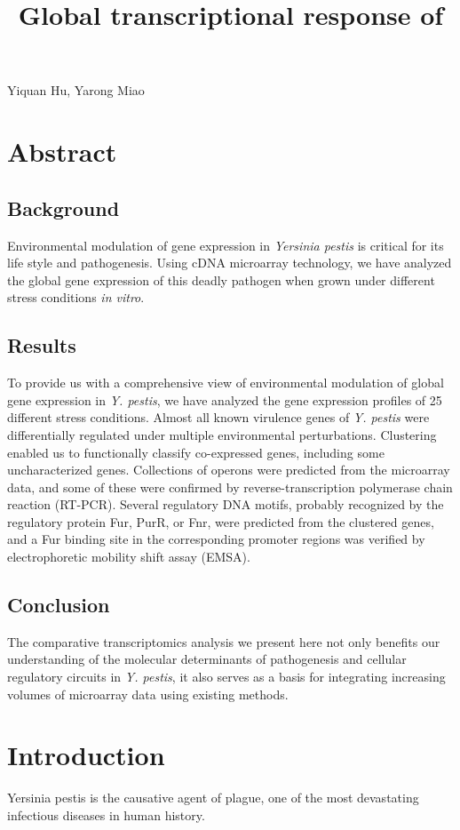 \documentclass[11pt,a4paper]{article}
\title{Global transcriptional response of}
\begin{document}
\maketitle

Yiquan Hu, Yarong Miao

\section{Abstract}

\subsection{Background}

Environmental modulation of gene expression in \textit{Yersinia pestis} is critical for its life style and pathogenesis. Using cDNA microarray technology, we have analyzed the global gene expression of this deadly pathogen when grown under different stress conditions \textit{in vitro}.

\subsection{Results}

To provide us with a comprehensive view of environmental modulation of global gene expression in \textit{Y. pestis}, we have analyzed the gene expression profiles of 25 different stress conditions. Almost all known virulence genes of \textit{Y. pestis} were differentially regulated under multiple environmental perturbations. Clustering enabled us to functionally classify co-expressed genes, including some uncharacterized genes. Collections of operons were predicted from the microarray data, and some of these were confirmed by reverse-transcription polymerase chain reaction (RT-PCR). Several regulatory DNA motifs, probably recognized by the regulatory protein Fur, PurR, or Fnr, were predicted from the clustered genes, and a Fur binding site in the corresponding promoter regions was verified by electrophoretic mobility shift assay (EMSA).

\subsection{Conclusion}

The comparative transcriptomics analysis we present here not only benefits our understanding of the molecular determinants of pathogenesis and cellular regulatory circuits in \textit{Y. pestis}, it also serves as a basis for integrating increasing volumes of microarray data using existing methods.

\section{Introduction}

Yersinia pestis is the causative agent of plague, one of the most devastating infectious diseases in human history.
\end{document}
